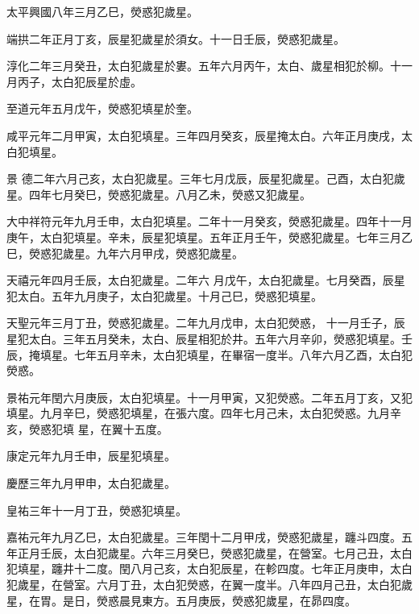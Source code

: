\begin{pinyinscope}
 太平興國八年三月乙巳，熒惑犯歲星。



 端拱二年正月丁亥，辰星犯歲星於須女。十一日壬辰，熒惑犯歲星。



 淳化二年三月癸丑，太白犯歲星於婁。五年六月丙午，太白、歲星相犯於柳。十一月丙子，太白犯辰星於虛。



 至道元年五月戊午，熒惑犯填星於奎。



 咸平元年二月甲寅，太白犯填星。三年四月癸亥，辰星掩太白。六年正月庚戌，太白犯填星。



 景
 德二年六月己亥，太白犯歲星。三年七月戊辰，辰星犯歲星。己酉，太白犯歲星。四年七月癸巳，熒惑犯歲星。八月乙未，熒惑又犯歲星。



 大中祥符元年九月壬申，太白犯填星。二年十一月癸亥，熒惑犯歲星。四年十一月庚午，太白犯填星。辛未，辰星犯填星。五年正月壬午，熒惑犯歲星。七年三月乙巳，熒惑犯歲星。九年六月甲戌，熒惑犯歲星。



 天禧元年四月壬辰，太白犯歲星。二年六
 月戊午，太白犯歲星。七月癸酉，辰星犯太白。五年九月庚子，太白犯歲星。十月己巳，熒惑犯填星。



 天聖元年三月丁丑，熒惑犯歲星。二年九月戊申，太白犯熒惑，
 十一月壬子，辰星犯太白。三年五月癸未，太白、辰星相犯於井。五年六月辛卯，熒惑犯填星。壬辰，掩填星。七年五月辛未，太白犯填星，在畢宿一度半。八年六月乙酉，太白犯熒惑。



 景祐元年閏六月庚辰，太白犯填星。十一月甲寅，又犯熒惑。二年五月丁亥，又犯填星。九月辛巳，熒惑犯填星，在張六度。四年七月己未，太白犯熒惑。九月辛亥，熒惑犯填
 星，在翼十五度。



 康定元年九月壬申，辰星犯填星。



 慶歷三年九月甲申，太白犯歲星。



 皇祐三年十一月丁丑，熒惑犯填星。



 嘉祐元年九月乙巳，太白犯歲星。三年閏十二月甲戌，熒惑犯歲星，躔斗四度。五年正月壬辰，太白犯歲星。六年三月癸巳，熒惑犯歲星，在營室。七月己丑，太白犯填星，躔井十二度。閏八月己亥，太白犯辰星，在軫四度。七年正月庚申，太白犯歲星，在營室。六月丁丑，太白犯熒惑，在翼一度半。八年四月己丑，太白犯歲星，在胃。是日，熒惑晨見東方。五月庚辰，熒惑犯歲星，在昴四度。




\end{pinyinscope}
